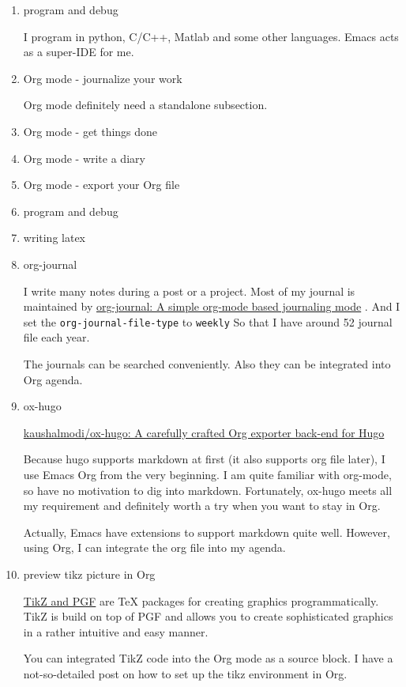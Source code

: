 \documentclass[koma,a4paper,captions=tableheading,11pt,listings-sv,microtype,paralist,colorlinks=true,urlcolor=blue,palatino]{org-article}
\begin{document}
\begin{enumerate}
\item program and debug
\label{sec:org2090515}


I program in python, C/C++, Matlab and some other languages. Emacs acts as a
super-IDE for me.


\item Org mode - journalize your work
\label{sec:org68fd51b}


Org mode definitely need a standalone subsection.

\item Org mode - get things done
\label{sec:orgc649c82}



\item Org mode - write a diary
\label{sec:orgc5ee9f2}

\item Org mode - export your Org file
\label{sec:orgec750d0}


\item program and debug
\label{sec:org78ee2a9}


\item writing latex
\label{sec:org5309ad9}
\item org-journal
\label{sec:orgb4dcd6b}


I write many notes during a post or a project. Most of my journal is maintained
by \href{https://github.com/bastibe/org-journal}{org-journal: A simple org-mode based journaling mode} . And I set the
\texttt{org-journal-file-type} to \texttt{weekly} So that I have around 52 journal file each
year.

The journals can be searched conveniently. Also they can be integrated into Org
agenda.


\item ox-hugo
\label{sec:org5a96636}


\href{https://github.com/kaushalmodi/ox-hugo}{kaushalmodi/ox-hugo: A carefully crafted Org exporter back-end for Hugo}

Because hugo supports markdown at first (it also supports org file later), I use
Emacs Org from the very beginning. I am quite familiar with org-mode, so have no
motivation to dig into markdown. Fortunately, ox-hugo meets all my requirement
and definitely worth a try when you want to stay in Org.

Actually, Emacs have extensions to support markdown quite well. However, using
Org, I can integrate the org file into my agenda.


\item preview tikz picture in Org
\label{sec:org8bf8be5}


\href{http://www.texample.net/tikz/}{TikZ and PGF} are \TeX{} packages for creating graphics programmatically. TikZ is
build on top of PGF and allows you to create sophisticated graphics in a rather
intuitive and easy manner.

You can integrated TikZ code into the Org mode as a source block. I have a
not-so-detailed post on how to set up the tikz environment in Org.
\end{enumerate}
\end{document}
